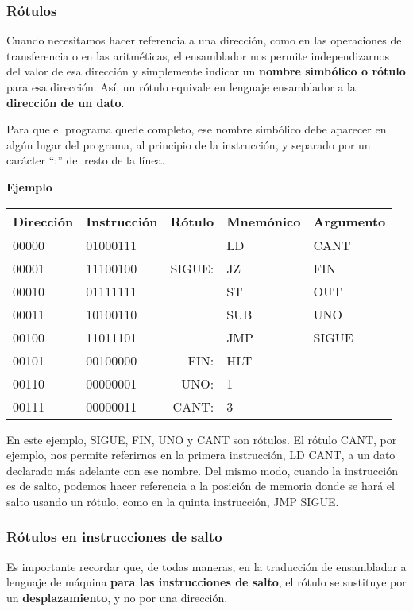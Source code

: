 \documentclass[spanish,a4paper,]{article}
\begin{document}
\hypertarget{ruxf3tulos}{%
\subsubsection{Rótulos}\label{ruxf3tulos}}

Cuando necesitamos hacer referencia a una dirección, como en las
operaciones de transferencia o en las aritméticas, el ensamblador nos
permite independizarnos del valor de esa dirección y simplemente indicar
un \textbf{nombre simbólico o rótulo} para esa dirección. Así, un rótulo
equivale en lenguaje ensamblador a la \textbf{dirección de un dato}.

Para que el programa quede completo, ese nombre simbólico debe aparecer
en algún lugar del programa, al principio de la instrucción, y separado
por un carácter ``:'' del resto de la línea.

\textbf{Ejemplo}

\begin{longtable}[]{@{}llrll@{}}
\toprule
Dirección & Instrucción & Rótulo & Mnemónico & Argumento\tabularnewline
\midrule
\endhead
00000 & 01000111 & & LD & CANT\tabularnewline
00001 & 11100100 & SIGUE: & JZ & FIN\tabularnewline
00010 & 01111111 & & ST & OUT\tabularnewline
00011 & 10100110 & & SUB & UNO\tabularnewline
00100 & 11011101 & & JMP & SIGUE\tabularnewline
00101 & 00100000 & FIN: & HLT &\tabularnewline
00110 & 00000001 & UNO: & 1 &\tabularnewline
00111 & 00000011 & CANT: & 3 &\tabularnewline
\bottomrule
\end{longtable}

En este ejemplo, SIGUE, FIN, UNO y CANT son rótulos. El rótulo CANT, por
ejemplo, nos permite referirnos en la primera instrucción, LD CANT, a un
dato declarado más adelante con ese nombre. Del mismo modo, cuando la
instrucción es de salto, podemos hacer referencia a la posición de
memoria donde se hará el salto usando un rótulo, como en la quinta
instrucción, JMP SIGUE.

\hypertarget{ruxf3tulos-en-instrucciones-de-salto}{%
\subsubsection{Rótulos en instrucciones de
salto}\label{ruxf3tulos-en-instrucciones-de-salto}}

Es importante recordar que, de todas maneras, en la traducción de
ensamblador a lenguaje de máquina \textbf{para las instrucciones de
salto}, el rótulo se sustituye por un \textbf{desplazamiento}, y no por
una dirección.
\end{document}
